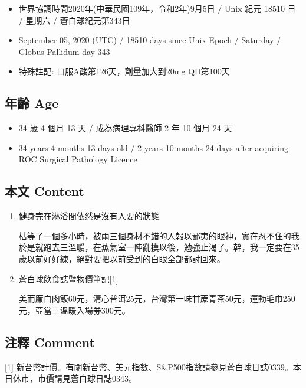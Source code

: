 \documentclass[a5paper, 11pt
]{book}
\providecommand{\tightlist}{%
  \setlength{\itemsep}{0pt}\setlength{\parskip}{0pt}}
\begin{document}
\begin{itemize}
\tightlist
\item
  世界協調時間2020年(中華民國109年，令和2年)9月5日 / Unix 紀元 18510 日
  / 星期六 / 蒼白球紀元第343日
\item
  September 05, 2020 (UTC) / 18510 days since Unix Epoch / Saturday /
  Globus Pallidum day 343
\item
  特殊註記: 口服A酸第126天，劑量加大到20mg QD第100天
\end{itemize}

\hypertarget{ux5e74ux9f61-age-4}{%
\subsection{年齡 Age}\label{ux5e74ux9f61-age-4}}

\begin{itemize}
\tightlist
\item
  34 歲 4 個月 13 天 / 成為病理專科醫師 2 年 10 個月 24 天
\item
  34 years 4 months 13 days old / 2 years 10 months 24 days after
  acquiring ROC Surgical Pathology Licence
\end{itemize}

\hypertarget{ux672cux6587-content-4}{%
\subsection{本文 Content}\label{ux672cux6587-content-4}}

\begin{enumerate}
\def\labelenumi{\arabic{enumi}.}
\item
  健身完在淋浴間依然是沒有人要的狀態

  枯等了一個多小時，被兩三個身材不錯的人報以鄙夷的眼神，實在忍不住的我於是就跑去三溫暖，在蒸氣室一陣亂摸以後，勉強止渴了。幹，我一定要在35歲以前好好練，絕對要把以前受到的白眼全部都討回來。
\item
  蒼白球飲食誌暨物價筆記{[}1{]}

  美而廉白肉飯60元，清心普洱25元，台灣第一味甘蔗青茶50元，運動毛巾250元，亞當三溫暖入場券300元。
\end{enumerate}

\hypertarget{ux6ce8ux91cb-comment-4}{%
\subsection{注釋 Comment}\label{ux6ce8ux91cb-comment-4}}

{[}1{]}
新台幣計價。有關新台幣、美元指數、S\&P500指數請參見蒼白球日誌0339。本日休市，市價請見蒼白球日誌0343。
\end{document}
